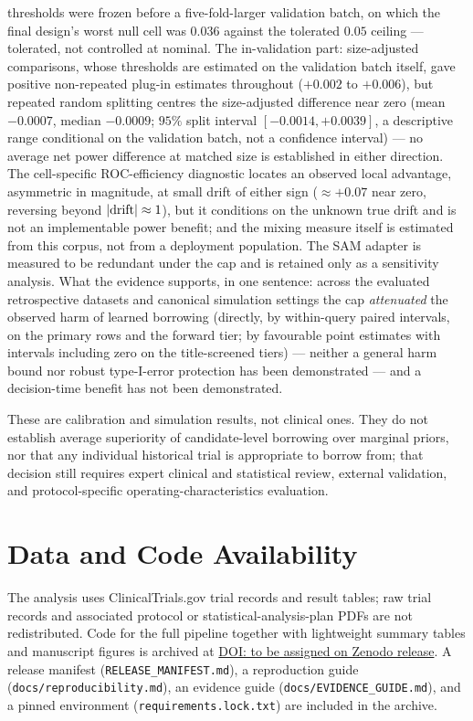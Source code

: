 \documentclass[11pt]{article}
\begin{document}
thresholds were frozen before a five-fold-larger validation batch, on
which the final design's worst null cell was $0.036$ against the
tolerated $0.05$ ceiling --- tolerated, not controlled at nominal. The
in-validation part: size-adjusted comparisons, whose thresholds are
estimated on the validation batch itself, gave positive non-repeated
plug-in estimates
throughout ($+0.002$ to $+0.006$), but repeated random splitting centres
the size-adjusted difference near zero (mean $-0.0007$, median
$-0.0009$; $95\%$ split interval
$[-0.0014, +0.0039]$, a descriptive range conditional on the validation
batch, not a confidence interval) --- no average net power difference at matched
size is established in either direction. The cell-specific
ROC-efficiency diagnostic locates an observed local advantage, asymmetric
in magnitude, at small
drift of either sign ($\approx +0.07$ near zero, reversing beyond
$|{\rm drift}| \approx 1$), but it conditions on the unknown true drift
and is not an implementable power benefit; and the mixing measure itself
is estimated from this corpus, not from a
deployment population. The SAM adapter is
measured to be redundant under the cap and is retained only as a
sensitivity analysis. What the evidence supports, in one sentence: across
the evaluated retrospective datasets and canonical simulation settings the
cap \emph{attenuated} the observed harm of learned borrowing (directly,
by within-query paired intervals, on the primary rows and the forward
tier; by favourable point estimates with intervals including zero on the
title-screened tiers) --- neither a
general harm bound nor robust type-I-error protection has been
demonstrated --- and a decision-time benefit has not been demonstrated.

These are calibration and simulation results, not clinical ones. They do not
establish average superiority of candidate-level borrowing over marginal
priors, nor that any individual historical trial is appropriate to borrow
from; that decision still requires expert clinical and statistical review,
external validation, and protocol-specific operating-characteristics
evaluation.

\section*{Data and Code Availability}
{\sloppy
The analysis uses ClinicalTrials.gov trial records and result tables; raw trial
records and associated protocol or statistical-analysis-plan PDFs are not
redistributed. Code for the full pipeline together with lightweight summary
tables and manuscript figures is archived at
\href{https://doi.org/}{DOI: to be assigned on Zenodo release}. A release
manifest (\texttt{RELEASE\_MANIFEST.md}), a reproduction guide
(\texttt{docs/rep\-ro\-du\-ci\-bi\-li\-ty.md}), an evidence guide
(\texttt{docs/EVIDENCE\_GUIDE.md}), and a pinned environment
(\texttt{requirements.lock.txt}) are included in the archive.
\par}
\end{document}
